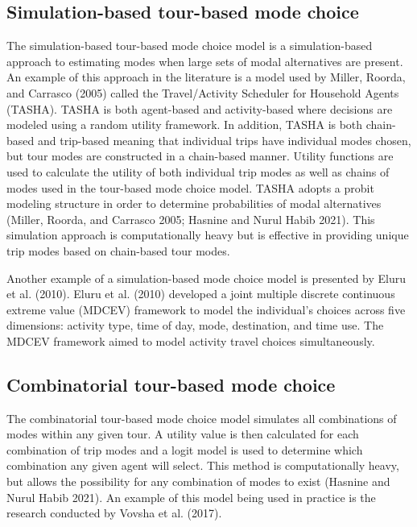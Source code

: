 \documentclass[12pt, oneside, openright]{byuthesis}
\begin{document}
\hypertarget{lit35}{%
\subsection{Simulation-based tour-based mode choice}\label{lit35}}

The simulation-based tour-based mode choice model is a simulation-based approach to estimating modes when large sets of modal alternatives are present. An example of this approach in the literature is a model used by Miller, Roorda, and Carrasco (2005) called the Travel/Activity Scheduler for Household Agents (TASHA). TASHA is both agent-based and activity-based where decisions are modeled using a random utility framework. In addition, TASHA is both chain-based and trip-based meaning that individual trips have individual modes chosen, but tour modes are constructed in a chain-based manner. Utility functions are used to calculate the utility of both individual trip modes as well as chains of modes used in the tour-based mode choice model. TASHA adopts a probit modeling structure in order to determine probabilities of modal alternatives (Miller, Roorda, and Carrasco 2005; Hasnine and Nurul Habib 2021). This simulation approach is computationally heavy but is effective in providing unique trip modes based on chain-based tour modes.

Another example of a simulation-based mode choice model is presented by Eluru et al. (2010). Eluru et al. (2010) developed a joint multiple discrete continuous extreme value (MDCEV) framework to model the individual's choices across five dimensions: activity type, time of day, mode, destination, and time use. The MDCEV framework aimed to model activity travel choices simultaneously.

\hypertarget{lit36}{%
\subsection{Combinatorial tour-based mode choice}\label{lit36}}

The combinatorial tour-based mode choice model simulates all combinations of modes within any given tour. A utility value is then calculated for each combination of trip modes and a logit model is used to determine which combination any given agent will select. This method is computationally heavy, but allows the possibility for any combination of modes to exist (Hasnine and Nurul Habib 2021). An example of this model being used in practice is the research conducted by Vovsha et al. (2017).
\end{document}
